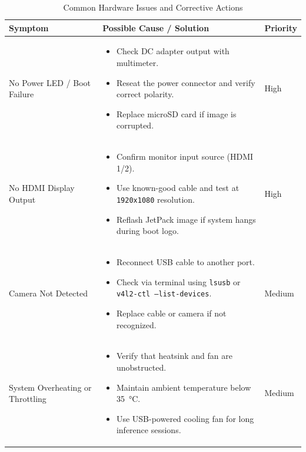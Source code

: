 \begin{table}[H]
	\centering
	\caption{Common Hardware Issues and Corrective Actions}
	\begin{tabular}{|L{3.8cm}|L{7.5cm}|L{2.5cm}|}
		\hline
		\textbf{Symptom} & \textbf{Possible Cause / Solution} & \textbf{Priority} \\ \hline
		No Power LED / Boot Failure & 
		\begin{itemize}[leftmargin=*]
			\item Check DC adapter output with multimeter.  
			\item Reseat the power connector and verify correct polarity.  
			\item Replace microSD card if image is corrupted.  
		\end{itemize} & High \\ \hline
		
		No HDMI Display Output & 
		\begin{itemize}[leftmargin=*]
			\item Confirm monitor input source (HDMI 1/2).  
			\item Use known-good cable and test at \texttt{1920x1080} resolution.  
			\item Reflash JetPack image if system hangs during boot logo.  
		\end{itemize} & High \\ \hline
		
		Camera Not Detected & 
		\begin{itemize}[leftmargin=*]
			\item Reconnect USB cable to another port.  
			\item Check via terminal using \texttt{lsusb} or \texttt{v4l2-ctl --list-devices}.  
			\item Replace cable or camera if not recognized.  
		\end{itemize} & Medium \\ \hline
		
		System Overheating or Throttling & 
		\begin{itemize}[leftmargin=*]
			\item Verify that heatsink and fan are unobstructed.  
			\item Maintain ambient temperature below \SI{35}{\celsius}.  
			\item Use USB-powered cooling fan for long inference sessions.  
		\end{itemize} & Medium \\ \hline
		

\end{tabular}
\end{table}
